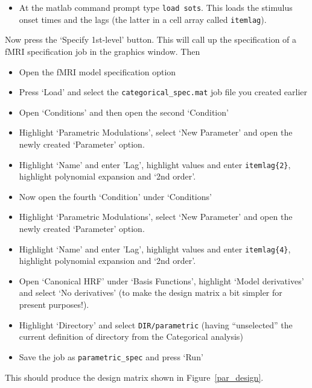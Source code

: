 \documentclass[a4paper,titlepage]{book}
\newcommand{\bi}{\begin{itemize}}
\newcommand{\ei}{\end{itemize}}
\begin{document}
\bi
\item{At the matlab command prompt type \verb!load sots!. This loads the stimulus onset times and the lags (the latter in a cell array called \verb!itemlag!).}
\ei

Now press the `Specify 1st-level' button. This will call up the specification of a fMRI specification job in the graphics window. Then
\bi
\item{Open the fMRI model specification option}
\item{Press `Load' and select the \verb!categorical_spec.mat! job file you created earlier}
\item{Open `Conditions' and then open the second `Condition'}
\item{Highlight `Parametric Modulations', select `New Parameter' and open the newly created `Parameter' option.}
\item{Highlight `Name' and enter 'Lag', highlight values and enter \verb!itemlag{2}!, highlight polynomial expansion and `2nd order'.}
\item{Now open the fourth `Condition' under `Conditions'}
\item{Highlight `Parametric Modulations', select `New Parameter' and open the newly created `Parameter' option.}
\item{Highlight `Name' and enter 'Lag', highlight values and enter \verb!itemlag{4}!, highlight polynomial expansion and `2nd order'.}
\item{Open `Canonical HRF' under `Basis Functions', highlight `Model derivatives' and select 
`No derivatives' (to make the design matrix a bit simpler for present purposes!).}
\item{Highlight `Directory' and select \verb!DIR/parametric! (having ``unselected'' the current definition of directory from the Categorical analysis)}
\item{Save the job as \verb!parametric_spec! and press `Run'}
\ei
This should produce the design matrix shown in Figure~\ref{par_design}.
\end{document}

